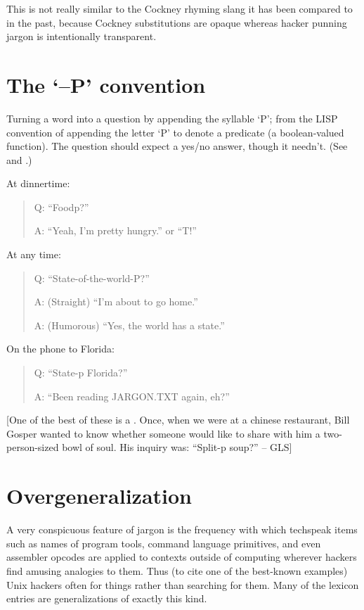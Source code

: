 	This is not really similar to the Cockney rhyming slang it has been compared to in the past, because Cockney substitutions are opaque
	whereas hacker punning jargon is intentionally transparent.


\section*{The `--P' convention}\label{The-P-convention}

	Turning a word into a question by appending the syllable `P'; from the LISP convention of appending the letter `P' to denote a
	predicate (a boolean-valued function). The question should expect a yes/no answer, though it needn't. (See  and
	.)

	At dinnertime:

	\begin{quote}
		Q: ``Foodp?''

		A: ``Yeah, I'm pretty hungry.'' or ``T!''
	\end{quote}

	At any time:

	\begin{quote}
		Q: ``State-of-the-world-P?''

		A: (Straight) ``I'm about to go home.''

		A: (Humorous) ``Yes, the world has a state.''
	\end{quote}

	On the phone to Florida:

	\begin{quote}
		Q: ``State-p Florida?''

		A: ``Been reading JARGON.TXT again, eh?''
	\end{quote}

	[One of the best of these is a . Once, when we were at a chinese restaurant, Bill Gosper wanted to know whether
	someone would like to share with him a two-person-sized bowl of soul. His inquiry was: ``Split-p soup?'' -- GLS]


\section*{Overgeneralization}\label{Overgeneralization}

	A very conspicuous feature of jargon is the frequency with which techspeak items such as names of program tools, command language
	primitives, and even assembler opcodes are applied to contexts outside of computing wherever hackers find amusing analogies to them.
	Thus (to cite one of the best-known examples) Unix hackers often  for things rather than searching for them. Many of
	the lexicon entries are generalizations of exactly this kind.

